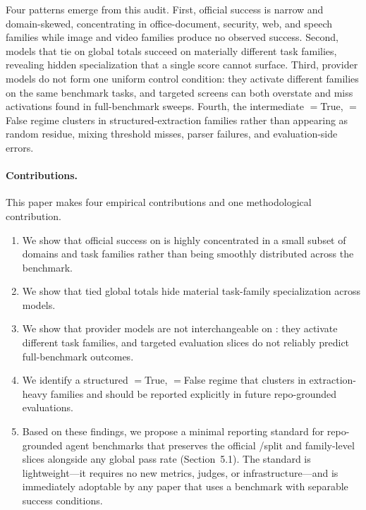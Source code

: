 Four patterns emerge from this audit. First, official \resultmetric success is
narrow and domain-skewed, concentrating in office-document, security, web, and
speech families while image and video families produce no observed success.
Second, models that tie on global \resultmetric totals succeed on materially
different task families, revealing hidden specialization that a single score
cannot surface. Third, provider models do not form one uniform control
condition: they activate different families on the same benchmark tasks, and
targeted screens can both overstate and miss activations found in full-benchmark
sweeps. Fourth, the intermediate \processmetric$=$True,
\resultmetric$=$False regime clusters in structured-extraction families rather
than appearing as random residue, mixing threshold misses, parser failures, and
evaluation-side errors.

\paragraph{Contributions.}
This paper makes four empirical contributions and one methodological
contribution.
\begin{enumerate}[leftmargin=1.25em]
\item We show that official \resultmetric success on \gittaskbench is highly
concentrated in a small subset of domains and task families rather than being
smoothly distributed across the benchmark.
\item We show that tied global \resultmetric totals hide material task-family
specialization across models.
\item We show that provider models are not interchangeable on \gittaskbench:
they activate different task families, and targeted evaluation slices do not
reliably predict full-benchmark outcomes.
\item We identify a structured \processmetric$=$True, \resultmetric$=$False
regime that clusters in extraction-heavy families and should be reported
explicitly in future repo-grounded evaluations.
\item Based on these findings, we propose a minimal reporting standard for
repo-grounded agent benchmarks that preserves the official
\processmetric/\resultmetric split and family-level slices alongside any
global pass rate (Section~5.1). The standard is lightweight---it requires no
new metrics, judges, or infrastructure---and is immediately adoptable by any
paper that uses a benchmark with separable success conditions.
\end{enumerate}
